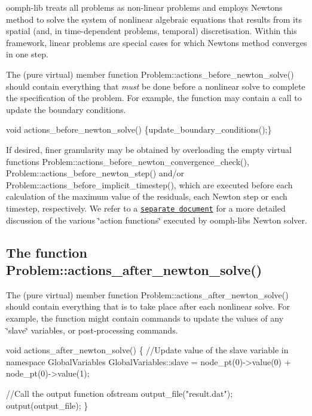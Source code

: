 {\ttfamily oomph-\/lib} treats all problems as non-\/linear problems and employs Newton\textquotesingle{}s method to solve the system of nonlinear algebraic equations that results from its spatial (and, in time-\/dependent problems, temporal) discretisation. Within this framework, linear problems are special cases for which Newton\textquotesingle{}s method converges in one step.

The (pure virtual) member function {\ttfamily Problem\+::actions\+\_\+before\+\_\+newton\+\_\+solve()} should contain everything that {\itshape must} be done before a nonlinear solve to complete the specification of the problem. For example, the function may contain a call to update the boundary conditions. 
\begin{DoxyCode}
\textcolor{keywordtype}{void} actions\_before\_newton\_solve() \{update\_boundary\_conditions();\}
\end{DoxyCode}


If desired, finer granularity may be obtained by overloading the empty virtual functions {\ttfamily Problem\+::actions\+\_\+before\+\_\+newton\+\_\+convergence\+\_\+check()}, {\ttfamily Problem\+::actions\+\_\+before\+\_\+newton\+\_\+step()} and/or {\ttfamily Problem\+::actions\+\_\+before\+\_\+implicit\+\_\+timestep()}, which are executed before each calculation of the maximum value of the residuals, each Newton step or each timestep, respectively. We refer to a \href{../../order_of_action_functions/html/index.html}{\tt separate document} for a more detailed discussion of the various \char`\"{}action functions\char`\"{} executed by {\ttfamily oomph-\/lib\textquotesingle{}s} Newton solver.\hypertarget{index_actafter}{}\subsection{The function Problem\+::actions\+\_\+after\+\_\+newton\+\_\+solve()}\label{index_actafter}
The (pure virtual) member function {\ttfamily Problem\+::actions\+\_\+after\+\_\+newton\+\_\+solve()} should contain everything that is to take place after each nonlinear solve. For example, the function might contain commands to update the values of any \char`\"{}slave\char`\"{} variables, or post-\/processing commands. 
\begin{DoxyCode}
\textcolor{keywordtype}{void} actions\_after\_newton\_solve()
 \{
  \textcolor{comment}{//Update value of the slave variable in namespace GlobalVariables}
  GlobalVariables::slave = node\_pt(0)->value(0) + node\_pt(0)->value(1);

  \textcolor{comment}{//Call the output function}
  ofstream output\_file(\textcolor{stringliteral}{"result.dat"});
  output(output\_file); 
 \}
\end{DoxyCode}


